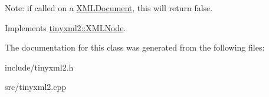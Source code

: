 Note\+: if called on a \hyperlink{classtinyxml2_1_1_x_m_l_document}{X\+M\+L\+Document}, this will return false. 

Implements \hyperlink{classtinyxml2_1_1_x_m_l_node_a7ce18b751c3ea09eac292dca264f9226}{tinyxml2\+::\+X\+M\+L\+Node}.



The documentation for this class was generated from the following files\+:\begin{DoxyCompactItemize}
\item 
include/tinyxml2.\+h\item 
src/tinyxml2.\+cpp\end{DoxyCompactItemize}
